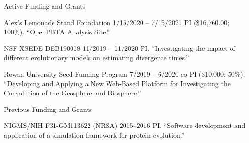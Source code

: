 \documentclass{resume} %
\begin{document}
\vspace*{0.35cm}
\begin{rSection}{Active Funding and Grants}
\vspace*{0.25cm}

%

\begin{rSubsection}
  {Alex's Lemonade Stand Foundation}
  {1/15/2020 -- 7/15/2021}
  {PI (\$16,760.00; 100\%). ``OpenPBTA Analysis Site.''}
\end{rSubsection}

\begin{rSubsection}
  {NSF XSEDE DEB190018}
  {11/2019 -- 11/2020}
  {PI. ``Investigating the impact of different evolutionary models on estimating divergence times.''}
\end{rSubsection}

\begin{rSubsection}
  {Rowan University Seed Funding Program}
  {7/2019 -- 6/2020}
  {co-PI (\$10,000; 50\%). ``Developing and Applying a New Web-Based Platform for Investigating the Coevolution of the Geosphere and Biosphere.''}
\end{rSubsection}





\vspace*{0.35cm}
\begin{rSection}{Previous Funding and Grants}
\vspace*{0.25cm}


\begin{rSubsection}
  {NIGMS/NIH F31-GM113622 (NRSA)}
  {2015--2016}
  {PI. ``Software development and application of a simulation framework for protein evolution.''}
\end{rSubsection}

\end{rSection}





\end{rSection}
\end{document}
